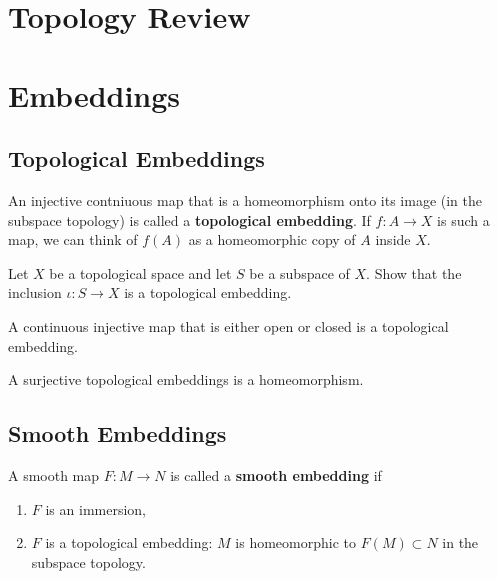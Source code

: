 \section{Topology Review}
\begin{theorem}
    
\end{theorem}


\section{Embeddings}
\subsection{Topological Embeddings}
An injective contniuous map that is a homeomorphism onto its image (in the subspace topology) is called a \textbf{topological embedding}. If $f:A \to X$ is such a map, we can think of $f(A)$ as a homeomorphic copy of $A$ inside $X$. 

\begin{exercise}
    Let $X$ be a topological space and let $S$ be a subspace of $X$. Show that the inclusion $\iota:S \to X$ is a topological embedding. 
\end{exercise}

\begin{proposition}
    A continuous injective map that is either open or closed is a topological embedding.
\end{proposition}

\begin{proposition}
    A surjective topological embeddings is a homeomorphism. 
\end{proposition}

\subsection{Smooth Embeddings}
A smooth map $F:M \to N$ is called a \textbf{smooth embedding} if 
\begin{enumerate}
    \item $F$ is an immersion, 
    \item $F$ is a topological embedding: $M$ is homeomorphic to $F(M) \subset N$ in the subspace topology.  
\end{enumerate}
\begin{example}

\end{example}